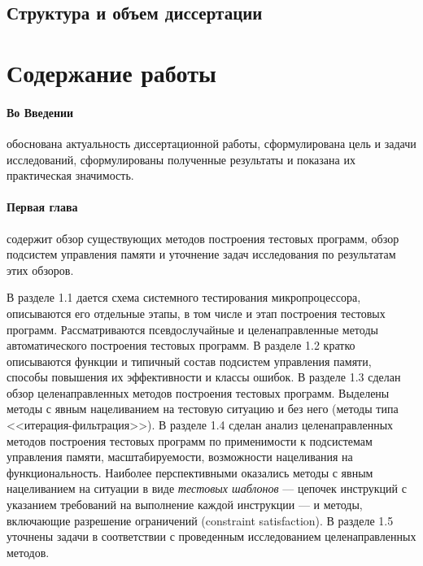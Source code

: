 \documentclass[14pt,autoref,href
,facsimile
]{disser}
\begin{document}
\subsection*{Структура и объем диссертации}
\Structure


%
%


\section*{Содержание работы}

\paragraph{Во Введении} обоснована актуальность диссертационной работы,
сформулирована цель и задачи исследований, сформулированы полученные результаты и показана их
практическая значимость.

%
%


\paragraph{Первая глава} содержит обзор существующих методов построения тестовых программ, обзор подсистем управления памяти и уточнение задач исследования по результатам этих обзоров.

В разделе 1.1 дается схема системного тестирования микропроцессора, описываются его отдельные этапы, в том числе и этап построения тестовых программ. Рассматриваются псевдослучайные и целенаправленные методы автоматического построения тестовых программ. В разделе 1.2 кратко описываются функции и типичный состав подсистем управления памяти, способы повышения их эффективности и классы ошибок. В разделе 1.3 сделан обзор целенаправленных методов построения тестовых программ. Выделены методы с явным нацеливанием на тестовую ситуацию и без него (методы типа <<итерация-фильтрация>>). В разделе 1.4 сделан анализ целенаправленных методов построения тестовых программ по применимости к подсистемам управления памяти, масштабируемости, возможности нацеливания на функциональность. Наиболее перспективными оказались методы с явным нацеливанием на ситуации в виде \emph{тестовых шаблонов} --- цепочек инструкций с указанием требований на выполнение каждой инструкции --- и методы, включающие разрешение ограничений (constraint satisfaction). В разделе 1.5 уточнены задачи в соответствии с проведенным исследованием целенаправленных методов.
\end{document}
